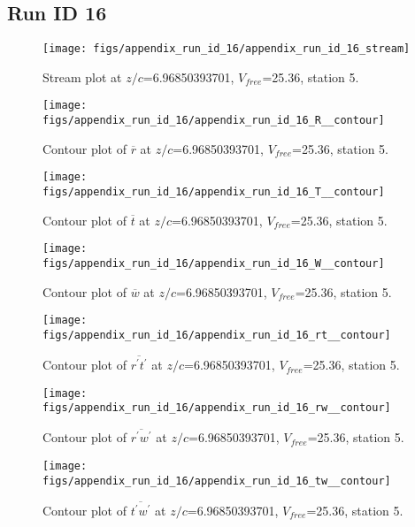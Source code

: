 \subsection{Run ID 16}
\begin{figure}[H]
\centering
\texttt{[image: figs/appendix\_run\_id\_16/appendix\_run\_id\_16\_stream]}
\caption{Stream plot at $z/c$=6.96850393701, $V_{free}$=25.36, station 5.}
\label{fig:appendix_run_id_16_stream}
\end{figure}


\begin{figure}[H]
\centering
\texttt{[image: figs/appendix\_run\_id\_16/appendix\_run\_id\_16\_R\_\_contour]}
\caption{Contour plot of $\overline{r}$ at $z/c$=6.96850393701, $V_{free}$=25.36, station 5.}
\label{fig:appendix_run_id_16_R__contour}
\end{figure}


\begin{figure}[H]
\centering
\texttt{[image: figs/appendix\_run\_id\_16/appendix\_run\_id\_16\_T\_\_contour]}
\caption{Contour plot of $\overline{t}$ at $z/c$=6.96850393701, $V_{free}$=25.36, station 5.}
\label{fig:appendix_run_id_16_T__contour}
\end{figure}


\begin{figure}[H]
\centering
\texttt{[image: figs/appendix\_run\_id\_16/appendix\_run\_id\_16\_W\_\_contour]}
\caption{Contour plot of $\overline{w}$ at $z/c$=6.96850393701, $V_{free}$=25.36, station 5.}
\label{fig:appendix_run_id_16_W__contour}
\end{figure}


\begin{figure}[H]
\centering
\texttt{[image: figs/appendix\_run\_id\_16/appendix\_run\_id\_16\_rt\_\_contour]}
\caption{Contour plot of $\overline{r^\prime t^\prime}$ at $z/c$=6.96850393701, $V_{free}$=25.36, station 5.}
\label{fig:appendix_run_id_16_rt__contour}
\end{figure}


\begin{figure}[H]
\centering
\texttt{[image: figs/appendix\_run\_id\_16/appendix\_run\_id\_16\_rw\_\_contour]}
\caption{Contour plot of $\overline{r^\prime w^\prime}$ at $z/c$=6.96850393701, $V_{free}$=25.36, station 5.}
\label{fig:appendix_run_id_16_rw__contour}
\end{figure}


\begin{figure}[H]
\centering
\texttt{[image: figs/appendix\_run\_id\_16/appendix\_run\_id\_16\_tw\_\_contour]}
\caption{Contour plot of $\overline{t^\prime w^\prime}$ at $z/c$=6.96850393701, $V_{free}$=25.36, station 5.}
\label{fig:appendix_run_id_16_tw__contour}
\end{figure}


